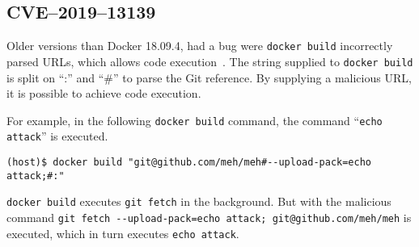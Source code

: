 \subsection{CVE--2019--13139}
Older versions than Docker 18.09.4, had a bug were \lstinline{docker build} incorrectly parsed URLs, which allows code execution~\cite{CVE-2019-13139-STAALDRAAD}. The string supplied to \lstinline{docker build} is split on ``:'' and ``\#'' to parse the Git reference. By supplying a malicious URL, it is possible to achieve code execution.

\medskip

For example, in the following \lstinline{docker build} command, the command ``\lstinline{echo attack}'' is executed.

\begin{lstlisting}[caption={\lstinline{docker build} command execution.},captionpos=b]
(host)$ docker build "git@github.com/meh/meh#--upload-pack=echo attack;#:"
\end{lstlisting}

\lstinline{docker build} executes \lstinline{git fetch} in the background. But with the malicious command \lstinline{git fetch --upload-pack=echo attack; git@github.com/meh/meh} is executed, which in turn executes \lstinline{echo attack}.
